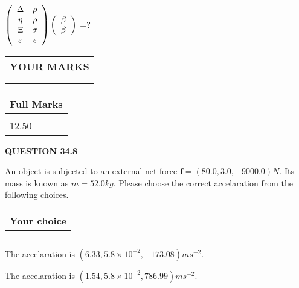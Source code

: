 \documentclass[12pt]{article}
\begin{document}
 
$  %
 \left( \begin{array}
 {
 c
 c
 }
 \Delta & 
 \rho \\ 
 \eta & 
 \rho \\ 
                    \Xi & 
 \sigma \\ 
 \varepsilon & 
 \epsilon
 \end{array} \right)
 \left( \begin{array}
 {
 c
 }
 \beta \\ 
 \beta
 \end{array} \right)
$ =?
 

 

 
\vspace{0.3in}
  
\vspace{0.2in}
  
\noindent\begin{tabular}{|l|}
\hline
 YOUR MARKS  \\
\hline
 \\ 
 \\ 
\hline
\end{tabular}
\hspace{0.05in} \begin{tabular}{|l|}
\hline
 Full Marks  \\
\hline
 \\ 
12.50 \\
\hline
\end{tabular}
{\textbf{\Large{QUESTION
34.8 
}}}
  
  
 
An object is subjected to an external net force $\mathbf{f}=
(80.0 , 3.0 , -9000.0) N$.
Its mass is known as $m= %
52.0 kg$.
Please choose the correct accelaration from the following choices.
  
  
\noindent\hspace{3.0in} \begin{tabular}{|l|}
\hline
Your choice \\
\hline
 \\ 
 \\ 
\hline
\end{tabular}
  
  
 
 
  The accelaration is $  %
(
6.33,
5.8 \times 10^{-2},
-173.08)
ms^{-2} $.
 
 
  The accelaration is $  %
(
1.54,
5.8 \times 10^{-2},
786.99)
ms^{-2} $.
 
\end{document}
